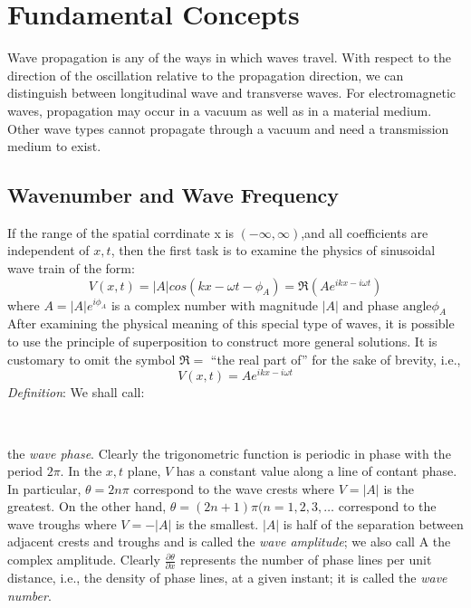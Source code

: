 \section {Fundamental Concepts}
Wave propagation is any of the ways in which waves travel.
With respect to the direction of the oscillation relative to the propagation direction, we can distinguish between longitudinal wave and transverse waves.
For electromagnetic waves, propagation may occur in a vacuum as well as in a material medium. Other wave types cannot propagate through a vacuum and need a transmission medium to exist.\cite{wiki:wp}

\subsection*{Wavenumber and Wave Frequency \cite{mitocwwp}}
If the range of the spatial corrdinate x is $(-\infty,\infty)$,and all coefficients are independent of $x,t$,  then the first task is to examine the physics
of sinusoidal wave train of the form:\\
\[V(x,t) = |A|cos(kx - \omega t - \phi_A)=\mathfrak{R}(A e^{ikx-i\omega t})\]
where $A = |A| e^{i \phi_A}$ is a complex number with magnitude $|A|\text{ and phase angle} \phi_A$ After
examining the physical meaning of this special type of waves, it is possible to use the
principle of superposition to construct more general solutions. It is customary to omit
the symbol $\mathfrak{R} = $ ``the real part of''  for the sake of brevity, i.e.,\\
\[V(x,t) = Ae^{ikx-i\omega t}\]
\emph{Definition}: We shall call:\\
\begin{center}
\\
\end{center}
the \emph{wave phase}. Clearly the trigonometric function is periodic in phase with the period $2 \pi$. In the $x,t$ plane, $V$ has a constant value along a line of contant phase. In particular, $\theta = 2n \pi$ correspond to the wave crests where $V = |A|$ is the greatest.
On the other hand, $\theta = (2n+1) \pi (n=1,2,3,\ldots$ correspond to the wave troughs where $V = -|A|$ is the smallest. $|A|$ is half of the separation between adjacent crests
and troughs and is called the \emph{wave amplitude}; we also call A the complex amplitude. Clearly $\frac{\partial \theta}{\partial x}$ represents the number of phase lines per unit distance, i.e., the density of
phase lines, at a given instant; it is called the \emph{wave number}.\\

